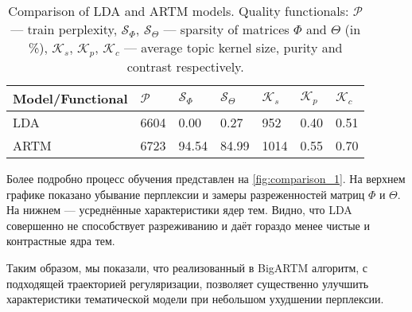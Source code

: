 \documentclass{article}
\begin{document}
\begin{table}
\begin{center}
\renewcommand{\arraystretch}{1.5}
\begin{tabular}[t]{P{8.4em}|P{2.9em} P{2.9em} P{2.9em} P{2.9em} P{2.9em} P{2.9em} }
\hline
Model/Functional & $\mathcal{P}$ &  $\mathcal{S}_{\Phi}$ & $\mathcal{S}_{\Theta}$ &  $\mathcal{K}_{s}$ & $\mathcal{K}_{p}$ &  $\mathcal{K}_{c}$ \\
\hline
LDA              & 6604 &  0.00  &   0.27 &   952 &  0.40 &  0.51 \\
ARTM             & 6723 &  94.54 &  84.99 &  1014 &  0.55 &  0.70 \\
\hline
\end{tabular}
\caption{Comparison of LDA and ARTM models. Quality functionals: $\mathcal{P}$ --- train perplexity, $\mathcal{S}_{\Phi}$, $\mathcal{S}_{\Theta}$ --- sparsity of matrices $\Phi$ and $\Theta$ (in \%), $\mathcal{K}_{s}$, $\mathcal{K}_{p}$, $\mathcal{K}_{c}$ --- average topic kernel size, purity and contrast respectively.}
\label{tab:model_comparison}
\end{center}
\end{table}

Более подробно процесс обучения представлен на \ref{fig:comparison_1}. На верхнем графике показано убывание перплексии и замеры разреженностей матриц $\Phi$ и $\Theta$. На нижнем --- усреднённые характеристики ядер тем. Видно, что LDA совершенно не способствует разреживанию и даёт гораздо менее чистые и контрастные ядра тем.

Таким образом, мы показали, что реализованный в BigARTM алгоритм, с подходящей траекторией регуляризации, позволяет существенно улучшить характеристики тематической модели при небольшом ухудшении перплексии.
\end{document}
